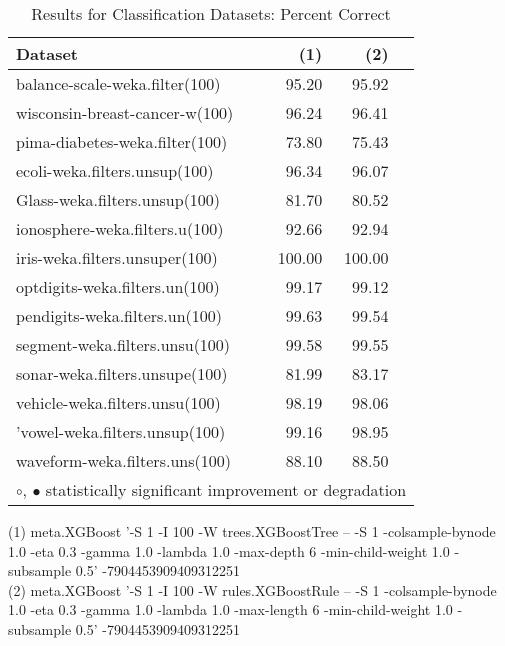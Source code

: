 \documentclass{article}
\begin{document}
\begin{table}[H]
\caption{\label{labelname}Results for Classification Datasets: Percent Correct}
\footnotesize
{\centering \begin{tabular}{lrr@{\hspace{0.1cm}}c}
\\
\hline
Dataset & (1)& (2) & \\
\hline
balance-scale-weka.filter(100) &  95.20 &  95.92 &         \\
wisconsin-breast-cancer-w(100) &  96.24 &  96.41 &         \\
pima-diabetes-weka.filter(100) &  73.80 &  75.43 &         \\
ecoli-weka.filters.unsup(100) &  96.34 &   96.07 &         \\
Glass-weka.filters.unsup(100) &  81.70 &  80.52 &         \\
ionosphere-weka.filters.u(100) &  92.66 &  92.94 &         \\
iris-weka.filters.unsuper(100) & 100.00 & 100.00 &         \\
optdigits-weka.filters.un(100) &  99.17 &  99.12 &         \\
pendigits-weka.filters.un(100) &  99.63 &  99.54 &         \\
segment-weka.filters.unsu(100) &  99.58 &  99.55 &         \\
sonar-weka.filters.unsupe(100) &  81.99 &  83.17 &         \\
vehicle-weka.filters.unsu(100) &  98.19 &  98.06 &         \\
'vowel-weka.filters.unsup(100) &  99.16 &  98.95 &         \\
waveform-weka.filters.uns(100) &  88.10 &  88.50 &         \\
\hline
\multicolumn{4}{c}{$\circ$, $\bullet$ statistically significant improvement or degradation}\\
\end{tabular} \footnotesize \par}
\end{table}

\begin{table}[H]
\scriptsize
{
(1) meta.XGBoost '-S 1 -I 100 -W trees.XGBoostTree -- -S 1 -colsample-bynode 1.0 -eta 0.3 -gamma 1.0 -lambda 1.0 -max-depth 6 -min-child-weight 1.0 -subsample 0.5' -7904453909409312251 \\
(2) meta.XGBoost '-S 1 -I 100 -W rules.XGBoostRule -- -S 1 -colsample-bynode 1.0 -eta 0.3 -gamma 1.0 -lambda 1.0 -max-length 6 -min-child-weight 1.0 -subsample 0.5' -7904453909409312251 \\
}

\end{table}
\end{document}
